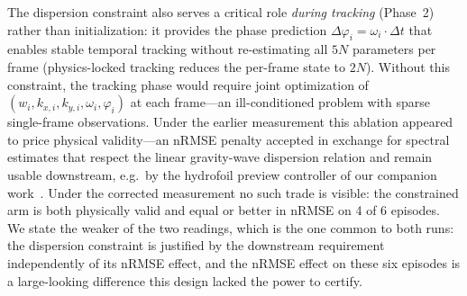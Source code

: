 The dispersion constraint also serves a critical role
\emph{during tracking} (Phase~2) rather than initialization: it
provides the phase prediction
$\Delta\varphi_i = \omega_i \cdot \Delta t$ that enables stable
temporal tracking without re-estimating all $5N$ parameters per frame
(physics-locked tracking reduces the per-frame state to $2N$).
Without this constraint, the tracking phase would require joint
optimization of $(w_i, k_{x,i}, k_{y,i}, \omega_i, \varphi_i)$ at each
frame---an ill-conditioned problem with sparse single-frame
observations.  Under the earlier measurement this ablation appeared to
price physical validity---an nRMSE penalty accepted in exchange for
spectral estimates that respect the linear gravity-wave dispersion
relation and remain usable downstream, e.g.\ by the hydrofoil preview
controller of our companion work~\citep{park2026hydrofoil}.  Under the
corrected measurement no such trade is visible: the constrained arm is
both physically valid and equal or better in nRMSE on 4 of 6 episodes.
We state the weaker of the two readings, which is the one common to both
runs: the dispersion constraint is justified by the downstream
requirement independently of its nRMSE effect, and the nRMSE effect on
these six episodes is a large-looking difference this design lacked the
power to certify.

